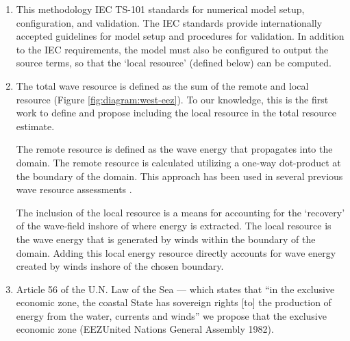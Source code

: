 \begin{enumerate}
    \item This methodology \DIFdelbegin {}\DIFdelend \DIFaddbegin {}\DIFaddend IEC TS-101 standards for numerical model setup, configuration, and validation. The IEC standards provide internationally accepted guidelines for model setup and procedures for validation. In addition to the IEC requirements, the model must also be configured to output the source terms, so that the `local resource' (defined below) can be computed.

    \item The total wave resource is defined as the sum of the remote and local resource (Figure \ref{fig:diagram:west-eez}). To our knowledge, this is the first work to define and propose including the local resource in the total resource estimate.

    The remote resource is defined as the wave energy that propagates into the domain. The remote resource is calculated utilizing a one-way dot-product at the boundary of the domain. This approach has been used in several previous wave resource assessments \DIFdelbegin {}\DIFdelend \DIFaddbegin {}\DIFaddend .

     The inclusion of the local resource is a means for accounting for the `recovery' of the wave-field inshore of where energy is extracted. The local resource is the wave energy that is generated by winds within the boundary of the domain. Adding this local energy resource directly accounts for wave energy created by winds inshore of the chosen boundary. \DIFaddbegin {}\DIFaddend 

    \item \DIFdelbegin {}\DIFdelend \DIFaddbegin {}\DIFaddend Article 56 of the U.N. Law of the Sea — which states that ``in the exclusive economic zone, the coastal State has sovereign rights [to] the production of energy from the water, currents and winds'' \DIFdelbegin \DIFdel{, }\DIFdelend \DIFaddbegin {}\DIFaddend we propose that \DIFdelbegin {}\DIFdelend \DIFaddbegin {}\DIFaddend the exclusive economic zone (EEZ\DIFdelbegin {}\DIFdelend \DIFaddbegin \DIFadd{, }\DIFaddend United Nations General Assembly 1982).
    \DIFdelbegin %
\DIFdelend 


\end{enumerate}
